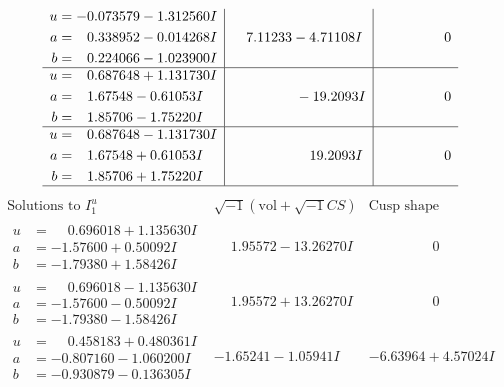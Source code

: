 \documentclass[1p]{elsarticle_modified}
\theoremstyle{definition}
\newcommand{\I}{\sqrt{-1}}
\begin{document}
$$\begin{array}{c|c|c}
\begin{aligned}
u &= -0.073579 - 1.312560 I \\
a &= \phantom{-}0.338952 - 0.014268 I \\
b &= \phantom{-}0.224066 - 1.023900 I\end{aligned}
 & \phantom{-}7.11233 - 4.71108 I & \phantom{-0.000000 } 0 \\ \hline\begin{aligned}
u &= \phantom{-}0.687648 + 1.131730 I \\
a &= \phantom{-}1.67548 - 0.61053 I \\
b &= \phantom{-}1.85706 - 1.75220 I\end{aligned}
 & \phantom{-0.000000 } -19.2093 I & \phantom{-0.000000 } 0 \\ \hline\begin{aligned}
u &= \phantom{-}0.687648 - 1.131730 I \\
a &= \phantom{-}1.67548 + 0.61053 I \\
b &= \phantom{-}1.85706 + 1.75220 I\end{aligned}
 & \phantom{-0.000000 -}19.2093 I & \phantom{-0.000000 } 0\\
 \hline 
 \end{array}$$\newpage$$\begin{array}{c|c|c}  
\text{Solutions to }I^u_{1}& \I (\text{vol} + \sqrt{-1}CS) & \text{Cusp shape}\\
 \hline 
\begin{aligned}
u &= \phantom{-}0.696018 + 1.135630 I \\
a &= -1.57600 + 0.50092 I \\
b &= -1.79380 + 1.58426 I\end{aligned}
 & \phantom{-}1.95572 - 13.26270 I & \phantom{-0.000000 } 0 \\ \hline\begin{aligned}
u &= \phantom{-}0.696018 - 1.135630 I \\
a &= -1.57600 - 0.50092 I \\
b &= -1.79380 - 1.58426 I\end{aligned}
 & \phantom{-}1.95572 + 13.26270 I & \phantom{-0.000000 } 0 \\ \hline\begin{aligned}
u &= \phantom{-}0.458183 + 0.480361 I \\
a &= -0.807160 - 1.060200 I \\
b &= -0.930879 - 0.136305 I\end{aligned}
 & -1.65241 - 1.05941 I & -6.63964 + 4.57024 I \\ \hline\begin{aligned}

\end{aligned}
\end{array}$$
\end{document}
